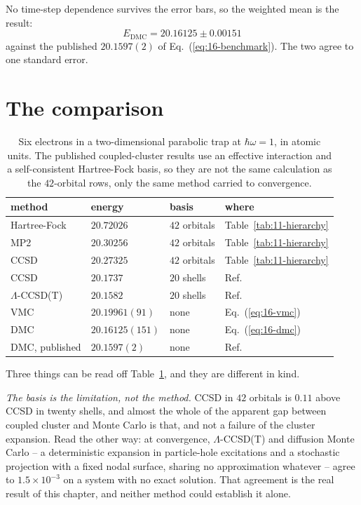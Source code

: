 No time-step dependence survives the error bars, so the weighted mean is the
result:
\begin{equation}
  \boxed{\;E_{\mathrm{DMC}} = 20.16125 \pm 0.00151\;}
  \label{eq:16-dmc}
\end{equation}
against the published $20.1597(2)$ of Eq.~(\ref{eq:16-benchmark}).  The two
agree to one standard error.

\section{The comparison}
\label{sec:appcomparison}

\begin{table}[h]
\centering
\renewcommand{\arraystretch}{1.25}
\setlength{\tabcolsep}{10pt}
\begin{tabular}{llll}
\toprule
method & energy & basis & where\\
\midrule
Hartree-Fock & $20.72026$ & $42$ orbitals
  & Table~\ref{tab:11-hierarchy}\\
MP2 & $20.30256$ & $42$ orbitals & Table~\ref{tab:11-hierarchy}\\
CCSD & $20.27325$ & $42$ orbitals & Table~\ref{tab:11-hierarchy}\\
CCSD & $20.1737$ & $20$ shells & Ref.~\cite{lohne2011}\\
$\Lambda$-CCSD(T) & $20.1582$ & $20$ shells & Ref.~\cite{lohne2011}\\
\midrule
VMC & $20.19961(91)$ & none & Eq.~(\ref{eq:16-vmc})\\
DMC & $20.16125(151)$ & none & Eq.~(\ref{eq:16-dmc})\\
DMC, published & $20.1597(2)$ & none & Ref.~\cite{lohne2011}\\
\bottomrule
\end{tabular}
\caption{Six electrons in a two-dimensional parabolic trap at
$\hbar\omega=1$, in atomic units.  The published coupled-cluster results use an
effective interaction and a self-consistent Hartree-Fock basis, so they are not
the same calculation as the $42$-orbital rows, only the same method carried to
convergence.}
\label{tab:16-comparison}
\end{table}

Three things can be read off Table~\ref{tab:16-comparison}, and they are
different in kind.

\emph{The basis is the limitation, not the method.}  CCSD in $42$ orbitals is
$0.11$ above CCSD in twenty shells, and almost the whole of the apparent gap
between coupled cluster and Monte Carlo is that, and not a failure of the
cluster expansion.  Read the other way: at convergence, $\Lambda$-CCSD(T) and
diffusion Monte Carlo -- a deterministic expansion in particle-hole excitations
and a stochastic projection with a fixed nodal surface, sharing no
approximation whatever -- agree to $1.5\times10^{-3}$ on a system with no exact
solution.  That agreement is the real result of this chapter, and neither
method could establish it alone.

